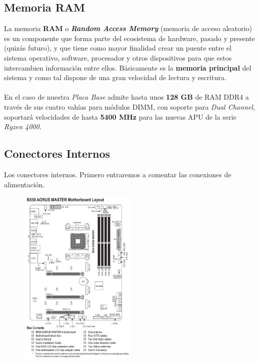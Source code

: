 \documentclass{article}
\begin{document}
\newpage
\subsection{Memoria RAM}
La memoria \textbf{RAM} o \textit{\textbf{Random Access Memory}} (memoria de acceso aleatorio) es un componente que forma parte del ecosistema de hardware, pasado y presente (quizás futuro), y que tiene como mayor finalidad 
crear un puente entre el sistema operativo, software, 
procesador y otros dispositivos para que estos intercambien información entre ellos. Básicamente es la \textbf{memoria principal} del sistema y como tal dispone de una gran velocidad de lectura y escritura.\\
\\
En el caso de nuestra \textit{Placa Base} admite hasta unos \textbf{128 GB} de RAM DDR4 a través de sus cuatro vahías para módulos DIMM, con soporte para \textit{Dual Channel}, soportará velocidades de hasta \textbf{5400 MHz} 
para las nuevas APU de la serie \textit{Ryzen 4000}.
\\
\subsection{Conectores Internos}
Los conectores internos. Primero entraremos a comentar las conexiones de alimentación.\\

  \begin{figure} %
    \centering
    \includegraphics[width=0.5\textwidth]{img/B550AORUSMasterDiagram.png}
  \end{figure}
\end{document}
